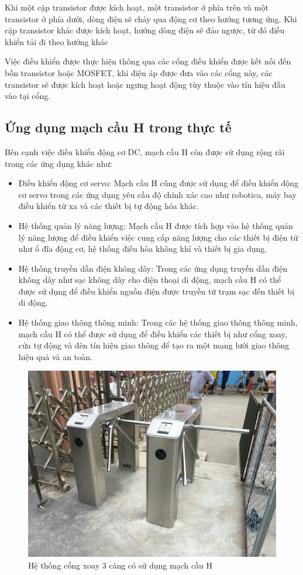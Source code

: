 \documentclass{article}
\begin{document}
Khi một cặp transistor được kích hoạt, một transistor ở phía trên và một transistor ở phía dưới, dòng điện sẽ chảy qua động cơ theo hướng tương ứng. Khi cặp transistor khác được kích hoạt, hướng dòng điện sẽ đảo ngược, từ đó điều khiển tải đi theo hướng khác

Việc điều khiển được thực hiện thông qua các cổng điều khiển được kết nối đến bồn transistor hoặc MOSFET, khi điện áp được đưa vào các cổng này, các transistor sẽ được kích hoạt hoặc ngưng hoạt động tùy thuộc vào tín hiệu đầu vào tại cổng.
\cleardoublepage
\subsection{Ứng dụng mạch cầu H trong thực tế}
Bên cạnh việc điều khiển động cơ DC, mạch cầu H còn được sử dụng rộng rãi trong các ứng dụng khác như:
\begin{itemize}
    \item Điều khiển động cơ servo: Mạch cầu H cũng được sử dụng để điều khiển động cơ servo trong các ứng dụng yêu cầu độ chính xác cao như robotica, máy bay điều khiển từ xa và các thiết bị tự động hóa khác.
    \item Hệ thống quản lý năng lượng: Mạch cầu H được tích hợp vào hệ thống quản lý năng lượng để điều khiển việc cung cấp năng lượng cho các thiết bị điện tử như ổ đĩa động cơ, hệ thống điều hòa không khí và thiết bị gia dụng.
    \item Hệ thống truyền dẫn điện không dây: Trong các ứng dụng truyền dẫn điện không dây như sạc không dây cho điện thoại di động, mạch cầu H có thể được sử dụng để điều khiển nguồn điện được truyền từ trạm sạc đến thiết bị di động.
    \item Hệ thống giao thông thông minh: Trong các hệ thống giao thông thông minh, mạch cầu H có thể được sử dụng để điều khiển các thiết bị như cổng xoay, cửa tự động và đèn tín hiệu giao thông để tạo ra một mạng lưới giao thông hiệu quả và an toàn.
\end{itemize}
\begin{figure}[H]
    \centering
    \includegraphics[width=1\textwidth]{image/cong3que.png}
    \caption{Hệ thống cổng xoay 3 càng có sử dụng mạch cầu H}
    \label{fig:hbridge}
\end{figure}
\cleardoublepage

\cleardoublepage
\end{document}
